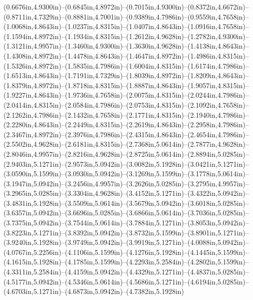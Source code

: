 (0.6676in,4.9300in)--(0.6845in,4.8972in)--(0.7015in,4.9300in)--(0.8372in,4.6672in)--(0.8711in,4.7329in)--(0.8881in,4.7001in)--(0.9389in,4.7986in)--(0.9559in,4.7658in)--(1.0068in,4.8643in)--(1.0237in,4.8315in)--(1.0407in,4.8643in)--(1.0916in,4.7658in)--(1.1594in,4.8972in)--(1.1934in,4.8315in)--(1.2612in,4.9628in)--(1.2782in,4.9300in)--(1.3121in,4.9957in)--(1.3460in,4.9300in)--(1.3630in,4.9628in)--(1.4138in,4.8643in)--(1.4308in,4.8972in)--(1.4478in,4.8643in)--(1.4647in,4.8972in)--(1.4986in,4.8315in)--(1.5326in,4.8972in)--(1.5835in,4.7986in)--(1.6004in,4.8315in)--(1.6174in,4.7986in)--(1.6513in,4.8643in)--(1.7191in,4.7329in)--(1.8039in,4.8972in)--(1.8209in,4.8643in)--(1.8379in,4.8972in)--(1.8718in,4.8315in)--(1.8887in,4.8643in)--(1.9057in,4.8315in)--(1.9227in,4.8643in)--(1.9736in,4.7658in)--(2.0075in,4.8315in)--(2.0244in,4.7986in)--(2.0414in,4.8315in)--(2.0584in,4.7986in)--(2.0753in,4.8315in)--(2.1092in,4.7658in)--(2.1262in,4.7986in)--(2.1432in,4.7658in)--(2.1771in,4.8315in)--(2.1940in,4.7986in)--(2.2280in,4.8643in)--(2.2449in,4.8315in)--(2.2619in,4.8643in)--(2.2958in,4.7986in)--(2.3467in,4.8972in)--(2.3976in,4.7986in)--(2.4315in,4.8643in)--(2.4654in,4.7986in)--(2.5502in,4.9628in)--(2.6181in,4.8315in)--(2.7368in,5.0614in)--(2.7877in,4.9628in)--(2.8046in,4.9957in)--(2.8216in,4.9628in)--(2.8725in,5.0614in)--(2.8894in,5.0285in)--(2.9403in,5.1271in)--(2.9573in,5.0942in)--(3.0082in,5.1928in)--(3.0421in,5.1271in)--(3.0590in,5.1599in)--(3.0930in,5.0942in)--(3.1269in,5.1599in)--(3.1778in,5.0614in)--(3.1947in,5.0942in)--(3.2456in,4.9957in)--(3.2626in,5.0285in)--(3.2795in,4.9957in)--(3.2965in,5.0285in)--(3.3304in,4.9628in)--(3.4152in,5.1271in)--(3.4322in,5.0942in)--(3.4831in,5.1928in)--(3.5509in,5.0614in)--(3.5679in,5.0942in)--(3.6018in,5.0285in)--(3.6357in,5.0942in)--(3.6696in,5.0285in)--(3.6866in,5.0614in)--(3.7036in,5.0285in)--(3.7375in,5.0942in)--(3.7544in,5.0614in)--(3.7884in,5.1271in)--(3.8053in,5.0942in)--(3.8223in,5.1271in)--(3.8392in,5.0942in)--(3.8732in,5.1599in)--(3.8901in,5.1271in)--(3.9240in,5.1928in)--(3.9749in,5.0942in)--(3.9919in,5.1271in)--(4.0088in,5.0942in)--(4.0767in,5.2256in)--(4.1106in,5.1599in)--(4.1276in,5.1928in)--(4.1445in,5.1599in)--(4.1615in,5.1928in)--(4.1785in,5.1599in)--(4.2293in,5.2584in)--(4.2802in,5.1599in)--(4.3311in,5.2584in)--(4.4159in,5.0942in)--(4.4329in,5.1271in)--(4.4837in,5.0285in)--(4.5177in,5.0942in)--(4.5346in,5.0614in)--(4.5686in,5.1271in)--(4.6194in,5.0285in)--(4.6703in,5.1271in)--(4.6873in,5.0942in)--(4.7382in,5.1928in) 